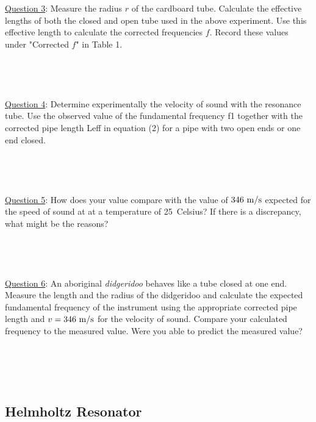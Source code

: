 \documentclass[11pt]{NSF}
\begin{document}
\underline{Question 3}: Measure the radius $r$ of the cardboard tube. Calculate the effective lengths of both the closed and open
tube used in the above experiment. Use this effective length to calculate the corrected frequencies $f$. Record these values under "Corrected $f$" in Table 1.
\\
\\
\\
\\
\\

\underline{Question 4}: Determine experimentally the velocity of sound with the resonance tube. Use the observed value
of the fundamental frequency f1 together with the corrected pipe length Leff in equation (2) for a
pipe with two open ends or one end closed. 
\\
\\
\\
\\
\\

\underline{Question 5}: How does your value compare with the value of 
$346~{\rm m/s}$ expected for the speed of sound at
at a temperature of 25~Celsius?
If there is a discrepancy, what might be the reasons?
\\
\\
\\
\\
\\


\underline{Question 6}: An aboriginal {\em didgeridoo} behaves like a tube closed at one end.
Measure the length and the radius of the didgeridoo and calculate the expected fundamental frequency of the instrument
using the appropriate corrected pipe length and $v=346~{\rm m/s}$
for the velocity of sound. Compare your calculated frequency to the measured value. Were you able to predict the measured value?
\\
\\
\\
\\
\\

\subsection{Helmholtz Resonator}
\end{document}
